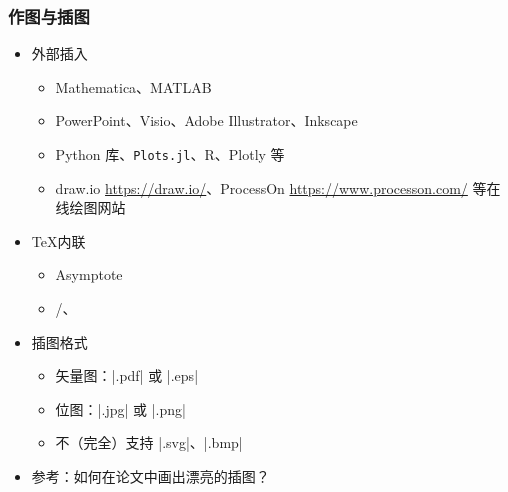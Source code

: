 \begin{frame}[fragile]
    \frametitle{作图与插图}
    \begin{itemize}
        \item 外部插入
              \begin{itemize}
                  \item Mathematica、MATLAB
                  \item PowerPoint、Visio、Adobe Illustrator、Inkscape
                  \item Python  库、\texttt{Plots.jl}、R、Plotly 等
                  \item draw.io \url{https://draw.io/}、ProcessOn \url{https://www.processon.com/} 等在线绘图网站
              \end{itemize}
        \item \TeX 内联
              \begin{itemize}
                  \item Asymptote
                  \item \alert{/、}
              \end{itemize}

        \item 插图格式

              \begin{itemize}
                  \item 矢量图：|.pdf| 或 |.eps|
                  \item 位图：|.jpg| 或 |.png|
                  \item 不（完全）支持 |.svg|、|.bmp|
              \end{itemize}

        \item 参考：如何在论文中画出漂亮的插图？
    \end{itemize}
\end{frame}

